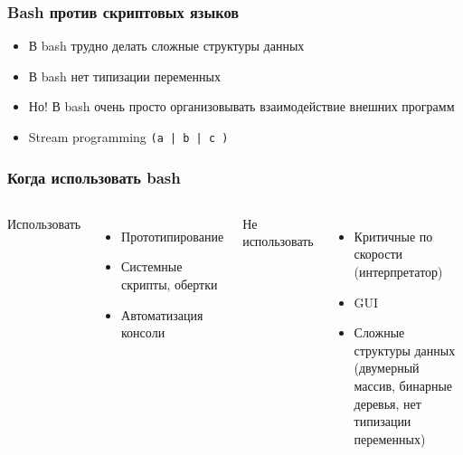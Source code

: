 \begin{frame}
  \frametitle{Bash против скриптовых языков}
  \begin{itemize}
   \item В bash трудно делать сложные структуры данных
   \item В bash нет типизации переменных
   \item Но! В bash очень просто организовывать взаимодействие внешних программ
   \item Stream programming \texttt{(a | b | c )}
  \end{itemize}
\end{frame}

\begin{frame}
  \frametitle{Когда использовать bash}
  \begin{columns}
    \begin{center}
     {\Large Использовать}
    \end{center}
    \begin{itemize}
      \item Прототипирование
      \item Системные скрипты, обертки
      \item Автоматизация консоли
    \end{itemize}
    \begin{center}
     {\Large Не использовать}
    \end{center}
    \begin{itemize}
      \item Критичные по скорости (интерпретатор)
      \item GUI
      \item Сложные структуры данных (двумерный массив, бинарные деревья, нет типизации переменных)
    \end{itemize}
  \end{columns}
\end{frame}
